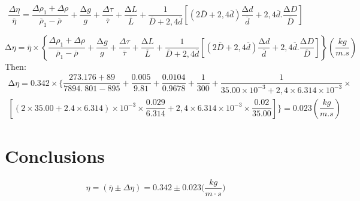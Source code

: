 \[\dfrac{{\Delta}\eta }{\overline{\eta }}=
\dfrac{\Delta \rho_1+ {\Delta }\rho }{{\overline{\rho }}_1-\overline{\rho }}+\dfrac{\mathrm{\Delta }g}{g}+\dfrac{{\Delta}\tau }{\overline{\tau }}+\dfrac{\mathrm{\Delta }L}{\overline{L}}+\dfrac{1}{\overline{D}+2,4\overline{d}} \left[\left(2\overline{D}+2,4\overline{d}\right)\dfrac{\mathrm{\Delta }d}{\overline{d}}+2,4\overline{d}.\dfrac{\mathrm{\Delta }D}{\overline{D}}\right]\]

\[\mathrm{\Delta }\eta =\overline{\eta }\times \left\{\dfrac{\Delta \rho_1+ {\Delta }\rho }{{\overline{\rho }}_1-\overline{\rho }}+\dfrac{\mathrm{\Delta }g}{g}+\dfrac{{\Delta}\tau }{\overline{\tau }}+\dfrac{\mathrm{\Delta }L}{\overline{L}}+\dfrac{1}{\overline{D}+2,4\overline{d}} \left[\left(2\overline{D}+2,4\overline{d}\right)\dfrac{\mathrm{\Delta }d}{\overline{d}}+2,4\overline{d}.\dfrac{\mathrm{\Delta }D}{\overline{D}}\right]\right\}(\dfrac{kg}{m.s})\]
Then:
\[ \] 
\begin{multline*}
    \mathrm{\Delta }\eta =0.342\times \bigg\{\dfrac{273.176+\mathrm{89}}{7894.\ 801-\mathrm{895}}+\dfrac{0.005}{9.81}+\dfrac{\mathrm{0.0104}}{\mathrm{0.9678}}+\dfrac{\mathrm{1}}{300}+\dfrac{1}{\mathrm{35.00}\times {10}^{-3}+2,4\times \mathrm{6.314}\times {10}^{-3}}\times \\
    \left[\left(\mathrm{2}\times \mathrm{35.00}+2.4\times \mathrm{6.314}\right)\times {10}^{-3}\times \dfrac{0.029}{\mathrm{6.314}}+2,4\times \mathrm{6.314}\times {10}^{-3}\times \dfrac{\mathrm{0.02}}{35.00}\right] \bigg\}=0.023(\dfrac{kg}{m.s})
\end{multline*}


\newpage
\section{Conclusions}
\[\eta = (\overline{\eta} \pm \Delta \eta) = 0.342 \pm 0.023 \bigg( \frac{kg}{m \cdot s}\bigg) \]
% 


